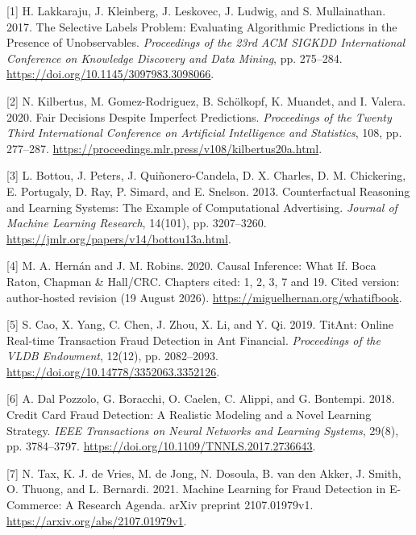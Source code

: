 \documentclass[
  11pt,
]{article}
\newlength{\cslhangindent}
\newlength{\cslentryspacingunit} %
\newenvironment{CSLReferences}[2] %
 {%
  \setlength{\parindent}{0pt}
  \ifodd #1
  \let\oldpar\par
  \def\par{\hangindent=\cslhangindent\oldpar}
  \fi
  \setlength{\parskip}{#2\cslentryspacingunit}
 }%
 {}
\begin{document}
\hypertarget{refs}{}
\begin{CSLReferences}{1}{1}
\leavevmode{}%
{[}1{]} H. Lakkaraju, J. Kleinberg, J. Leskovec, J. Ludwig, and S.
Mullainathan. 2017. The Selective Labels Problem: Evaluating Algorithmic
Predictions in the Presence of Unobservables. \emph{Proceedings of the
23rd ACM SIGKDD International Conference on Knowledge Discovery and Data
Mining}, pp. 275--284. \url{https://doi.org/10.1145/3097983.3098066}.

\leavevmode{}%
{[}2{]} N. Kilbertus, M. Gomez-Rodriguez, B. Schölkopf, K. Muandet, and
I. Valera. 2020. Fair Decisions Despite Imperfect Predictions.
\emph{Proceedings of the Twenty Third International Conference on
Artificial Intelligence and Statistics}, 108, pp. 277--287.
\url{https://proceedings.mlr.press/v108/kilbertus20a.html}.

\leavevmode{}%
{[}3{]} L. Bottou, J. Peters, J. Quiñonero-Candela, D. X. Charles, D. M.
Chickering, E. Portugaly, D. Ray, P. Simard, and E. Snelson. 2013.
Counterfactual Reasoning and Learning Systems: The Example of
Computational Advertising. \emph{Journal of Machine Learning Research},
14(101), pp. 3207--3260.
\url{https://jmlr.org/papers/v14/bottou13a.html}.

\leavevmode{}%
{[}4{]} M. A. Hernán and J. M. Robins. 2020. Causal Inference: What If.
Boca Raton, Chapman \& Hall/CRC. Chapters cited: 1, 2, 3, 7 and 19.
Cited version: author-hosted revision (19 August 2026).
\url{https://miguelhernan.org/whatifbook}.

\leavevmode{}%
{[}5{]} S. Cao, X. Yang, C. Chen, J. Zhou, X. Li, and Y. Qi. 2019.
TitAnt: Online Real-time Transaction Fraud Detection in Ant Financial.
\emph{Proceedings of the VLDB Endowment}, 12(12), pp. 2082--2093.
\url{https://doi.org/10.14778/3352063.3352126}.

\leavevmode{}%
{[}6{]} A. Dal Pozzolo, G. Boracchi, O. Caelen, C. Alippi, and G.
Bontempi. 2018. Credit Card Fraud Detection: A Realistic Modeling and a
Novel Learning Strategy. \emph{IEEE Transactions on Neural Networks and
Learning Systems}, 29(8), pp. 3784--3797.
\url{https://doi.org/10.1109/TNNLS.2017.2736643}.

\leavevmode{}%
{[}7{]} N. Tax, K. J. de Vries, M. de Jong, N. Dosoula, B. van den
Akker, J. Smith, O. Thuong, and L. Bernardi. 2021. Machine Learning for
Fraud Detection in E-Commerce: A Research Agenda. arXiv preprint
2107.01979v1. \url{https://arxiv.org/abs/2107.01979v1}.


\end{CSLReferences}
\end{document}
